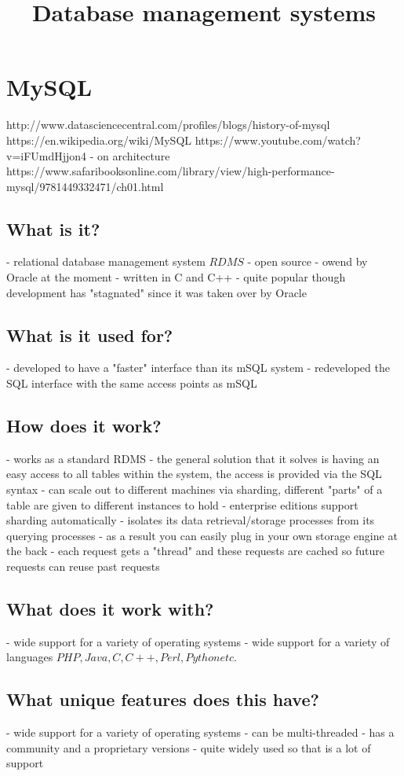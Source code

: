 \title{Database management systems}

\chapter{MySQL}
http://www.datasciencecentral.com/profiles/blogs/history-of-mysql
https://en.wikipedia.org/wiki/MySQL
https://www.youtube.com/watch?v=iFUmdHjjon4
- on architecture
https://www.safaribooksonline.com/library/view/high-performance-mysql/9781449332471/ch01.html

\section{What is it?}
- relational database management system \(RDMS\)
- open source
- owend by Oracle at the moment
- written in C and C++
- quite popular though development has "stagnated" since it was taken over by Oracle

\section{What is it used for?}
- developed to have a "faster" interface than its mSQL system
- redeveloped the SQL interface with the same access points as mSQL

\section{How does it work?}
- works as a standard RDMS
- the general solution that it solves is having an easy access to all tables within the system, the access is provided via the SQL syntax
- can scale out to different machines via sharding, different "parts" of a table are given to different instances to hold - enterprise editions support sharding automatically
- isolates its data retrieval/storage processes from its querying processes - as a result you can easily plug in your own storage engine at the back
- each request gets a "thread" and these requests are cached so future requests can reuse past requests

\section{What does it work with?}
- wide support for a variety of operating systems
- wide support for a variety of languages \(PHP, Java, C, C++, Perl, Python etc.\)

\section{What unique features does this have?}
- wide support for a variety of operating systems
- can be multi-threaded
- has a community and a proprietary versions
- quite widely used so that is a lot of support

